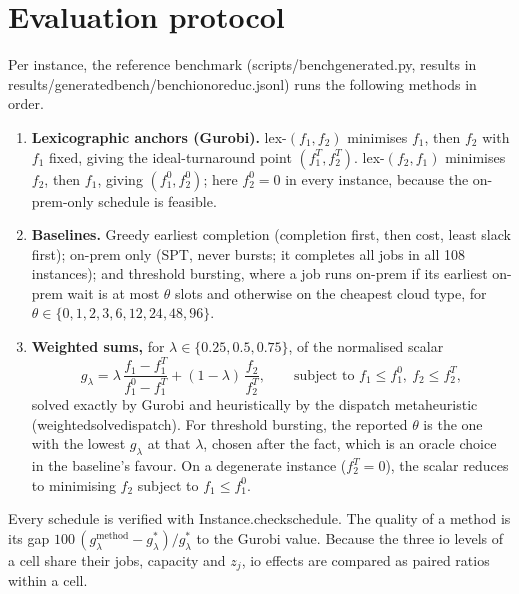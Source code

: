 \documentclass[11pt,a4paper]{article}
\newcommand{\codeus}{\textunderscore\allowbreak}
\newcommand{\code}[1]{{\ttfamily\let\_\codeus #1}}
\begin{document}
\section{Evaluation protocol}\label{sec:protocol}
Per instance, the reference benchmark (\code{scripts/\allowbreak bench\_generated.py}, results
in \code{results/\allowbreak generated\_bench/\allowbreak bench\_io\_noreduc.jsonl}) runs the following
methods in order.

\begin{enumerate}
\item \textbf{Lexicographic anchors (Gurobi).} lex-$(f_1,f_2)$ minimises $f_1$, then
  $f_2$ with $f_1$ fixed, giving the ideal-turnaround point $(f_1^T, f_2^T)$.
  lex-$(f_2,f_1)$ minimises $f_2$, then $f_1$, giving $(f_1^0, f_2^0)$; here
  $f_2^0=0$ in every instance, because the on-prem-only schedule is feasible.
\item \textbf{Baselines.} Greedy earliest completion (completion first, then
  cost, least slack first); on-prem only (SPT, never bursts; it completes all
  jobs in all 108 instances); and threshold bursting, where a job runs on-prem if
  its earliest on-prem wait is at most $\theta$ slots and otherwise on the cheapest
  cloud type, for $\theta\in\{0,1,2,3,6,12,24,48,96\}$.
\item \textbf{Weighted sums,} for $\lambda\in\{0.25,0.5,0.75\}$, of the
  normalised scalar
  \begin{equation}
    g_\lambda = \lambda\,\frac{f_1-f_1^T}{f_1^0-f_1^T} + (1-\lambda)\,\frac{f_2}{f_2^T},
    \qquad\text{subject to } f_1\le f_1^0,\ f_2\le f_2^T,
  \end{equation}
  solved exactly by Gurobi and heuristically by the dispatch metaheuristic
  (\code{weighted\_solve\_dispatch}). For threshold bursting, the reported $\theta$
  is the one with the lowest $g_\lambda$ at that $\lambda$, chosen after the fact,
  which is an oracle choice in the baseline's favour. On a degenerate instance
  ($f_2^T=0$), the scalar reduces to minimising $f_2$ subject to $f_1\le f_1^0$.
\end{enumerate}
Every schedule is verified with \code{Instance.check\_schedule}. The quality of a
method is its gap $100\,(g_\lambda^{\text{method}}-g_\lambda^*)/g_\lambda^*$ to the
Gurobi value. Because the three io levels of a cell share their jobs, capacity and
$z_j$, io effects are compared as paired ratios within a cell.
\end{document}
